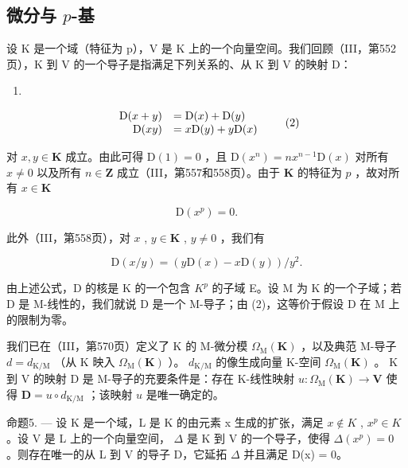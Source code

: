 \subsection{\texorpdfstring{微分与 \(p\)-基}{微分与 p-基}}

设 K 是一个域（特征为 p），V 是 K 上的一个向量空间。我们回顾（III，第552页），K 到 V 的一个导子是指满足下列关系的、从 K 到 V 的映射 D：

\begin{enumerate}
\def\labelenumi{(\arabic{enumi})}
\tightlist
\item
\end{enumerate}

\[
\begin{array}{r l} \mathrm{D} (x + y) & = \mathrm{D} (x) + \mathrm{D} (y) \\ \mathrm{D} (x y) & = x \mathrm{D} (y) + y \mathrm{D} (x) \end{array}\tag{2}
\]

对 \(x, y \in \mathbf{K}\) 成立。由此可得 \(\mathrm{D}(1) = 0\) ，且 \(\mathrm{D}(x^n) = nx^{n-1}\mathrm{D}(x)\) 对所有 \(x \neq 0\) 以及所有 \(n \in \mathbf{Z}\) 成立（III，第557和558页）。由于 \(\mathbf{K}\) 的特征为 \(p\) ，故对所有 \(x \in \mathbf{K}\)

\[
\mathrm{D} \left(x ^ {p}\right) = 0.\tag{3}
\]

此外（III，第558页），对 \(x\) , \(y \in \mathbf{K}\) , \(y \neq 0\) ，我们有

\[
\mathrm{D} (x / y) = \left(y \mathrm{D} (x) - x \mathrm{D} (y)\right) / y ^ {2}.\tag{4}
\]

由上述公式，D 的核是 K 的一个包含 \(K^{p}\) 的子域 E。设 M 为 K 的一个子域；若 D 是 M-线性的，我们就说 D 是一个 M-导子；由 (2)，这等价于假设 D 在 M 上的限制为零。

我们已在（III，第570页）定义了 K 的 M-微分模 \(\Omega_{\mathrm{M}}(\mathbf{K})\) ，以及典范 M-导子 \(d = d_{\mathrm{K / M}}\) （从 K 映入 \(\Omega_{\mathrm{M}}(\mathbf{K})\) ）。 \(d_{\mathrm{K / M}}\) 的像生成向量 K-空间 \(\Omega_{\mathrm{M}}(\mathbf{K})\) 。 K 到 V 的映射 D 是 M-导子的充要条件是：存在 K-线性映射 \(u: \Omega_{\mathrm{M}}(\mathbf{K}) \to \mathbf{V}\) 使得 \(\mathbf{D} = u \circ d_{\mathrm{K / M}}\) ；该映射 \(u\) 是唯一确定的。

命题5. --- 设 K 是一个域，L 是 K 的由元素 x 生成的扩张，满足 \(x \notin K\) , \(x^{p} \in K\) 。设 V 是 L 上的一个向量空间， \(\Delta\) 是 K 到 V 的一个导子，使得 \(\Delta(x^{p}) = 0\) 。则存在唯一的从 L 到 V 的导子 D，它延拓 \(\Delta\) 并且满足 D(x) = 0。

